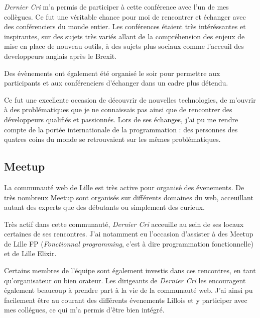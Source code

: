 \documentclass[12pt,a4paper]{article}
\begin{document}
  \emph{Dernier Cri} m'a permis de participer à cette conférence avec l'un
  de mes collègues. Ce fut une véritable chance pour moi de rencontrer et
  échanger avec des conférenciers du monde entier. Les conférences étaient
  très intéréssantes et inspirantes, sur des sujets très variés allant de
  la compréhension des enjeux de mise en place de nouveau outils, à des
  sujets plus sociaux comme l'acceuil des developpeurs anglais après le
  Brexit.

  \bigskip

  Des évènements ont également été organisé le soir pour permettre aux
  participants et aux conférenciers d'échanger dans un cadre plus détendu.

  \bigskip

  Ce fut une excellente occasion de découvrir de nouvelles technologies,
  de m'ouvrir à des problématiques que je ne connaissais pas ainsi que de
  rencontrer des développeurs qualifiés et passionnés. Lors de ses
  échanges, j'ai pu me rendre compte de la portée internationale de la
  programmation : des personnes des quatres coins du monde se retrouvaient
  sur les mêmes problématiques.

  \bigskip

  \subsection{Meetup}\label{meetup}

  \bigskip

  La communauté web de Lille est très active pour organisé des évenements.
  De très nombreux Meetup sont organisés sur différents domaines du web,
  acceuillant autant des experts que des débutants ou simplement des
  curieux.

  \bigskip

  Très actif dans cette communauté, \emph{Dernier Cri} acceuille au sein
  de ses locaux certaines de ses rencontres. J'ai notamment eu l'occasion
  d'assister à des Meetup de Lille FP (\emph{Fonctionnal programming},
  c'est à dire programmation fonctionnelle) et de Lille Elixir.

  \bigskip

  Certains membres de l'équipe sont également investis dans ces
  rencontres, en tant qu'organisateur ou bien orateur. Les dirigeants de
  \emph{Dernier Cri} les encouragent également beaucoup à prendre part à
  la vie de la communauté web. J'ai ainsi pu facilement être au courant
  des différents évenements Lillois et y participer avec mes collégues, ce
  qui m'a permis d'être bien intégré.
\end{document}
